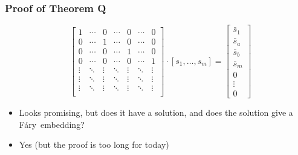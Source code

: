 \documentclass[xcolor=dvipsnames]{beamer}
\newcommand{\Fary}{F\'ary}
\begin{document}
\begin{frame}
   \frametitle{Proof of Theorem Q}
   \[
       \begin{array}{c}
       \end{array}
       \left[\begin{array}{ccccccc}
       1 & \cdots & 0 & \cdots&  0 & \cdots & 0 \\
       0 & \cdots & 1 & \cdots&  0 & \cdots & 0  \\
       0 & \cdots & 0 & \cdots&  1 & \cdots & 0  \\
       0 & \cdots & 0 & \cdots&  0 & \cdots & 1  \\
       \vdots & \ddots & \vdots & \ddots & \vdots & \ddots & \vdots  \\
       \vdots & \ddots & \vdots & \ddots & \vdots & \ddots & \vdots  \\
       \vdots & \ddots & \vdots & \ddots & \vdots & \ddots & \vdots  \\
       \end{array}\right]
       \cdot
       [s_1,\ldots,s_m] =
       \left[\begin{array}{c}
        \bar{s}_1\\
        \bar{s}_a\\
        \bar{s}_b\\
        \bar{s}_m\\
        0\\ 
        \vdots \\
        0
      \end{array}\right]
   \]
   \begin{itemize}[<+->]
     \item Looks promising, but does it have a solution, and does the solution
       give a \Fary\ embedding?
     \item Yes (but the proof is too long for today)
   \end{itemize}
\end{frame}
 
\end{document}
